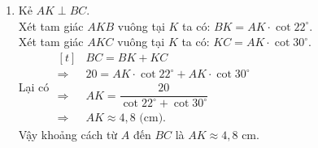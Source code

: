 \begin{bt}
{\begin{enumerate}
	$HA=BH\cdot \cot \widehat{BAH} = 10 \cdot \cot 52^\circ \approx 7{,}8$ (cm).\\
	Xét tam giác $BHC$ vuông tại $H$ ta có:
	$BC^2=BH^2+HC^2$ (định lí Pythagore)\\
	$\Rightarrow 20^2=10^2+HC^2$\\
	$\Rightarrow HC=\sqrt{20^2-10^2}=10\sqrt{3}$ (cm).\\
	Lại có
	$\begin{aligned}[t]
	&HC=HA+AC \\
	&\Rightarrow AC = HC-HA \\
	&\Rightarrow AC=10\sqrt{3}-7{,}8 \approx 9{,}5 \text{ (cm).}
	\end{aligned}$
	\item Kẻ $AK \perp BC$.\\
	Xét tam giác $AKB$ vuông tại $K$ ta có: $BK = AK \cdot \cot 22^\circ$. \\
	Xét tam giác $AKC$ vuông tại $K$ ta có: $KC = AK \cdot \cot 30^\circ$. \\
	Lại có 
	$\begin{aligned}[t]
	&BC=BK+KC \\
	\Rightarrow & 20=AK \cdot \cot 22^\circ + AK \cdot \cot 30^\circ \\
	\Rightarrow & AK=\dfrac{20}{\cot 22^\circ + \cot 30^\circ} \\
	\Rightarrow & AK\approx 4{,}8 \text{ (cm).}
	\end{aligned}$\\
	Vậy khoảng cách từ $A$ đến $BC$ là $AK \approx 4{,}8$ cm.
	\end{enumerate}
	}
\end{bt}
